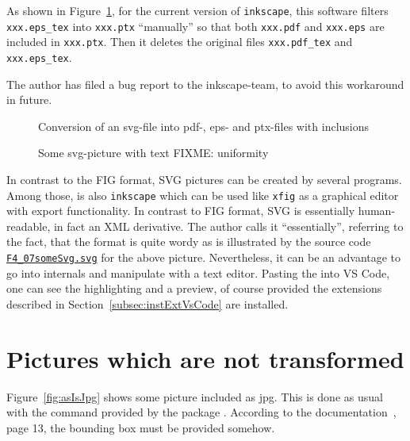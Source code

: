 As shown in Figure~\ref{fig:svg2pdf},
for the current version of \texttt{inkscape},
this software filters \texttt{xxx.eps\_tex} into \texttt{xxx.ptx}
``manually'' so that both \texttt{xxx.pdf} and \texttt{xxx.eps}
are included in \texttt{xxx.ptx}.
Then it deletes the original files
\texttt{xxx.pdf\_tex} and \texttt{xxx.eps\_tex}.

The author has filed a bug report to the inkscape-team,
to avoid this workaround in future. 

\begin{figure}[htb]
\centering
{}
\caption{\label{fig:svg2pdf}Conversion of an svg-file 
into pdf-, eps- and ptx-files with inclusions}
\end{figure}


\begin{figure}[htb]
\centering
\caption{\label{fig:svgWithText}Some svg-picture with text FIXME\@: uniformity  }
\end{figure}

In contrast to the FIG format, 
SVG pictures can be created by several programs. 
Among those, is also \texttt{inkscape} 
which can be used like \texttt{xfig}  
as a graphical editor with export functionality. 
In contrast to FIG format, 
SVG is essentially human-readable, 
in fact an XML derivative. 
The author calls it ``essentially'', 
referring to the fact, that the format is quite wordy 
as is illustrated by the source code 
\href{\urlSite fromTex/F4_07someSvg.svg}{\texttt{F4\_07someSvg.svg}} 
for the above picture. 
Nevertheless, it can be an advantage 
to go into internals and manipulate with a text editor. 
Pasting the into VS Code, one can see the highlighting and a preview, 
of course provided the extensions 
described in Section~\ref{subsec:instExtVsCode} are installed. 


\section{Pictures which are not transformed}\label{sec:picasis}

Figure~\ref{fig:asIsJpg} shows some picture included as jpg. 
This is done as usual with the command 
provided by the package . 
According to the documentation~\cite{GraX}, page 13, 
the bounding box must be provided somehow. 

